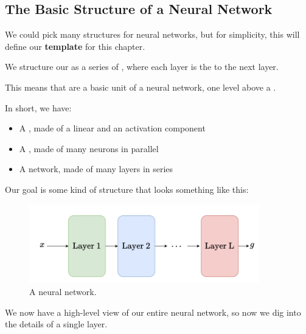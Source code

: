     \subsection*{The Basic Structure of a Neural Network}
        
        We could pick many structures for neural networks, but for simplicity, this will define our \textbf{template} for this chapter.\\
        
        \begin{definition}
            We structure our  as a series of , where each layer is the  to the next layer.
            
            This means that  are a basic unit of a neural network, one level above a .
        \end{definition}
        
        In short, we have:
        
        \begin{itemize}
            \item A , made of a linear and an activation component
            
            \item A , made of many neurons in parallel
            
            \item A  network, made of many layers in series
        \end{itemize}
        
        Our goal is some kind of structure that looks something like this:
        
        \begin{figure}[H]
            \centering
            \includegraphics[width=100mm,scale=0.4]{images/nn_images/layers.png}
            \caption*{A neural network.}
        \end{figure}
        
        We now have a high-level view of our entire neural network, so now we dig into the details of a single layer.
        
        